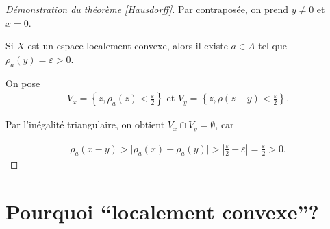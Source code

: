 \documentclass[french]{book}
\theoremstyle{definition}
\newcommand{\lesss}{<}
\newcommand{\less}{\lesss}
\newcommand{\biggg}{>}
\newcommand{\bg}{\biggg}
\begin{document}
\begin{proof}[Démonstration du théorème \ref{Hausdorff}]
  Par contraposée, on prend $y \neq 0$ et $ x = 0$.

  Si $X$ est un espace localement convexe, alors il existe $a \in A$ tel que $\rho_a(y) = \varepsilon \bg 0$.

  On pose
  \begin{gather}
    V_x = \left\{ z, \rho_a(z) \less \frac{\varepsilon }{2} \right\} \text{ et } V_y = \left\{ z, \rho(z-y) \less \frac{\varepsilon }{2} \right\} .
  \end{gather}

  Par l'inégalité triangulaire, on obtient $V_x \cap V_y = \emptyset$, car

  \begin{gather*}
    \rho_a(x-y) \bg \lvert \rho_a(x) - \rho_a(y) \rvert \bg \left\lvert \frac{\varepsilon }{2} - \varepsilon  \right\rvert = \frac{\varepsilon }{2} \bg 0.
  \end{gather*}






\end{proof}

\section{Pourquoi ``localement convexe''?}
\end{document}
